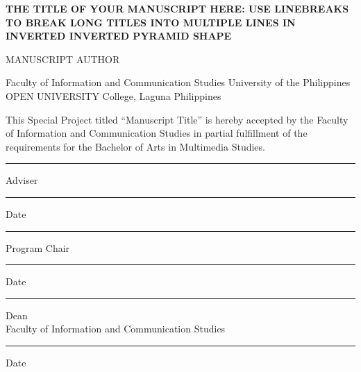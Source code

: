 \documentclass[
    14pt,
    letterpaper,
]{extreport}
\begin{document}
\begin{titlepage}

    \centering

    \vspace*{5\baselineskip}

    \textbf{\uppercase{%
        The Title of Your Manuscript Here: Use Linebreaks\linebreak
        to Break Long Titles Into Multiple Lines in\linebreak
        Inverted Inverted Pyramid Shape
    }}

    \vspace{10\baselineskip}
    \uppercase{Manuscript Author}

    \vfill

    Faculty of Information and Communication Studies\linebreak
    University of the Philippines\linebreak
    \uppercase{Open University}\linebreak
    College, Laguna\linebreak
    Philippines

\end{titlepage}

\thispagestyle{empty}

This Special Project titled ``Manuscript Title'' is hereby accepted by the
Faculty of Information and Communication Studies in partial fulfillment of the
requirements for the Bachelor of Arts in Multimedia Studies.

\vfill

\begin{center}
    \rule{0.33\textwidth}{1pt}\linebreak
    Adviser

    \rule{0.25\textwidth}{1pt}\linebreak
    Date
\end{center}

\vfill

\begin{center}
    \rule{0.33\textwidth}{1pt}\linebreak
    Program Chair

    \rule{0.25\textwidth}{1pt}\linebreak
    Date
\end{center}
\vfill

\begin{center}
    \rule{0.33\textwidth}{1pt}\linebreak
    Dean\\
    Faculty of Information and\linebreak
    Communication Studies

    \rule{0.25\textwidth}{1pt}\linebreak
    Date
\end{center}
\end{document}
